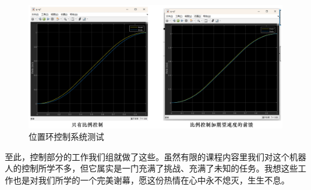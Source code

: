 \begin{figure}[htbp]
    \centering
    \includegraphics[width=\textwidth]{Image/fig43.png}
    \caption{位置环控制系统测试}
    \label{fig:40}
\end{figure}

至此，控制部分的工作我们组就做了这些。虽然有限的课程内容里我们对这个机器人的控制所学不多，但它属实是一门充满了挑战、充满了未知的任务。我想这些工作也是对我们所学的一个完美谢幕，愿这份热情在心中永不熄灭，生生不息。